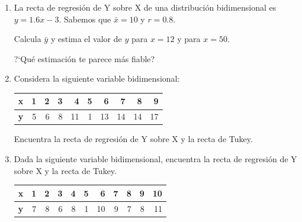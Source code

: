 \begin{adjustwidth}{20pt}{10pt}
\begin{enumerate}[PB. 1. ]
\item La recta de regresión de Y sobre X de una distribución bidimensional es $y = 1.6 x - 3$. Sabemos que $\bar x = 10$ y $r = 0.8$.

Calcula $\bar y$ y estima el valor de $y$ para $x = 12$ y para $x = 50$. 

?`Qué estimación te parece más fiable?
 
\hspace{-1cm}

\hspace{-1cm}\vspace{1cm}




\item Considera la siguiente variable bidimensional:

\begin{table}[H]
\centering
\begin{tabular}{|c|r|r|r|r|r|r|r|r|r|}
\hline
\textbf{x} & 1 & 2 & 3 & 4 & 5 & 6 & 7 & 8 & 9 \\ \hline
\textbf{y} & 5 & 6 & 8 & 11 & 1 & 13 & 14 & 14 & 17 \\ \hline
\end{tabular}
\end{table}

Encuentra la recta de regresión de Y sobre X y la recta de Tukey.
 
\hspace{-1cm}\vspace{1cm}




\item Dada la siguiente variable bidimensional, encuentra la recta de regresión de Y sobre X y la recta de Tukey.

\begin{table}[H]
\centering
\begin{tabular}{|c|r|r|r|r|r|r|r|r|r|r|}
\hline
\textbf{x} & 1 & 2 & 3 & 4 & 5 & 6 & 7 & 8 & 9 & 10 \\ \hline
\textbf{y} & 7 & 8 & 6 & 8 & 1 & 10 & 9 & 7 & 8 & 11 \\ \hline
\end{tabular}
\end{table}
 

\end{enumerate}
\end{adjustwidth}
